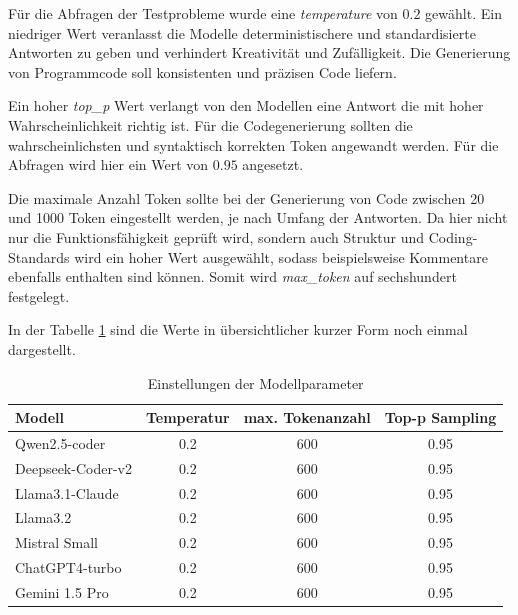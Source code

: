 Für die Abfragen der Testprobleme wurde eine \textit{temperature} von $0.2$ gewählt. Ein niedriger Wert veranlasst die Modelle deterministischere und standardisierte Antworten zu geben und verhindert Kreativität und Zufälligkeit. Die Generierung von Programmcode soll konsistenten und präzisen Code liefern.\vspace{0.2cm}

Ein hoher \textit{top\_p} Wert verlangt von den Modellen eine Antwort die mit hoher Wahrscheinlichkeit richtig ist. Für die Codegenerierung sollten die wahrscheinlichsten und syntaktisch korrekten Token angewandt werden. Für die Abfragen wird hier ein Wert von $0.95$ angesetzt.\vspace{0.2cm}

Die maximale Anzahl Token sollte bei der Generierung von Code zwischen 20 und 1000 Token eingestellt werden, je nach Umfang der Antworten. Da hier nicht nur die Funktionsfähigkeit geprüft wird, sondern auch Struktur und Coding-Standards wird ein hoher Wert ausgewählt, sodass beispielsweise Kommentare ebenfalls enthalten sind können. Somit wird \textit{max\_token} auf sechshundert festgelegt.\vspace{0.2cm}

In der Tabelle \ref{tab:params_for_llms} sind die Werte in übersichtlicher kurzer Form noch einmal dargestellt.

\begin{table}[!ht]
	\begin{tabular}{|l|c|c|c|}
		\hline
		\textbf{Modell} & \textbf{Temperatur} & \textbf{max. Tokenanzahl} & \textbf{Top-p Sampling} \\
		\hline
		Qwen2.5-coder     & 0.2 & 600 & 0.95 \\
		Deepseek-Coder-v2 & 0.2 & 600 & 0.95 \\
		Llama3.1-Claude   & 0.2 & 600 & 0.95 \\
		Llama3.2          & 0.2 & 600 & 0.95 \\
		Mistral Small     & 0.2 & 600 & 0.95 \\
		ChatGPT4-turbo    & 0.2 & 600 & 0.95 \\
		Gemini 1.5 Pro    & 0.2 & 600 & 0.95 \\
		\hline
	\end{tabular}
	\centering
	\caption{Einstellungen der Modellparameter}
	\label{tab:params_for_llms}
\end{table}

